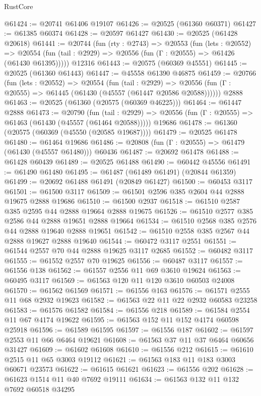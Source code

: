 \begin{lexlean}{RustCore}
\begin{coremodule}
@61424 := @20741 @61406 @19107
@61426 := @20525 (@61360 @60371)
@61427 := @61385 @60374
@61428 := @20597 @61427
@61430 := @20525 (@61428 @20618)
@61441 := @20744
    (fun (rty : @2743) =>
    @20553
      (fun (lets : @20552) =>
      @20554 (fun (tail : @2929) => @20556 (fun (Γ : @20555) => @61426 (@61430 @61395)))))
    @12316
@61443 := @20575 (@60369 @45551)
@61445 := @20525 (@61360 @61443)
@61447 := @45558 @61390 @46875
@61459 := @20766
    (fun (lets : @20552) =>
    @20554
      (fun (tail : @2929) =>
      @20556 (fun (Γ : @20555) => @61445 (@61430 (@45557 (@61447 @20586 @20588))))))
    @2888
@61463 := @20525 (@61360 (@20575 (@60369 @46225)))
@61464 := @61447 @2888
@61473 := @20790
    (fun (tail : @2929) => @20556 (fun (Γ : @20555) => @61463 (@61430 (@45557 (@61464 @20588)))))
    @19686
@61478 := @61360 (@20575 (@60369 (@45550 (@20585 @19687))))
@61479 := @20525 @61478
@61480 := @61464 @19686
@61486 := @20808 (fun (Γ : @20555) => @61479 (@61430 (@45557 @61480))) @60436
@61487 := @20692 @61478
@61488 := @61428 @60439
@61489 := @20525 @61488
@61490 := @60442 @45556
@61491 := @61490 @61480
@61495 := @61487 (@61489 @61491) (@20844 @61359)
@61499 := @20692 @61488 @61491 (@20849 @61427)
@61500 := @60453 @3117
@61501 := @61500 @3117
@61509 := @61501 @2596 @385 @2604 @44 @2888 @19675 @2888 @19686
@61510 := @61500 @2937
@61518 := @61510 @2587 @385 @2595 @44 @2888 @19664 @2888 @19675
@61526 := @61510 @2577 @385 @2586 @44 @2888 @19651 @2888 @19664
@61534 := @61510 @2568 @385 @2576 @44 @2888 @19640 @2888 @19651
@61542 := @61510 @2558 @385 @2567 @44 @2888 @19627 @2888 @19640
@61544 := @60472 @3117 @2551
@61551 := @61544 @2557 @70 @44 @2888 @19625 @3117 @2685
@61552 := @60482 @3117
@61555 := @61552 @2557 @70 @19625
@61556 := @60487 @3117
@61557 := @61556 @138
@61562 := @61557 @2556 @11 @69 @3610 @19624
@61563 := @60495 @3117
@61569 := @61563 @120 @11 @120 @3610 @60503 @24008
@61570 := @61562 @61569
@61571 := @61556 @163
@61576 := @61571 @2555 @11 @68 @2932 @19623
@61582 := @61563 @22 @11 @22 @2932 @60583 @23258
@61583 := @61576 @61582
@61584 := @61556 @218
@61589 := @61584 @2554 @11 @67 @4174 @19622
@61595 := @61563 @152 @11 @152 @4174 @60598 @25918
@61596 := @61589 @61595
@61597 := @61556 @187
@61602 := @61597 @2553 @11 @66 @6464 @19621
@61608 := @61563 @37 @11 @37 @6464 @60656 @31427
@61609 := @61602 @61608
@61610 := @61556 @212
@61615 := @61610 @2515 @11 @65 @3003 @19112
@61621 := @61563 @183 @11 @183 @3003 @60671 @23573
@61622 := @61615 @61621
@61623 := @61556 @202
@61628 := @61623 @1514 @11 @40 @7692 @19111
@61634 := @61563 @132 @11 @132 @7692 @60518 @34295

\end{coremodule}
\end{lexlean}
